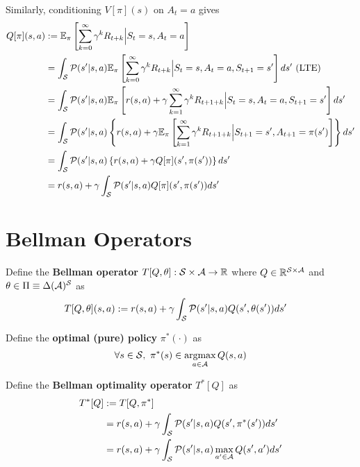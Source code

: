\documentclass{article}
\begin{document}
	Similarly, conditioning $V[\pi](s)$ on $A_t = a$ gives 
	\begin{align}
		Q[\pi](s, a) &:= \mathbb{E}_{\pi}\left[\sum_{k=0}^{\infty} \gamma^{k} R_{t+k} \Big| S_{t}=s, A_t = a\right] \\
		&= \int_{\mathcal{{S}}}
			\mathcal{{P}}(s'|s, a)
			\mathbb{E}_\pi
			\left[ \sum_{k=0}^{\infty} \gamma^{k} R_{t+k} \Big| S_{t}=s, A_t = a, S_{t+1} = s' \right]
			ds' \text{{ (LTE)}} \\
		&= \int_{\mathcal{{S}}}
			\mathcal{{P}}(s'|s, a)
			\mathbb{E}_\pi
			\left[ r(s,a) + \gamma \sum_{k=1}^{\infty} \gamma^{k} R_{t+1+k} \Big| S_{t}=s, A_t = a, S_{t+1} = s' \right] ds' \\
		&= \int_{\mathcal{{S}}}
			\mathcal{{P}}(s'|s, a) \left\{
			r(s,a) + \gamma \mathbb{E}_\pi
			\left[\sum_{k=1}^{\infty} \gamma^{k} R_{t+1+k} \Big| S_{t+1} = s', A_{t+1} = \pi(s')\right] \right \}ds' \\
		&= \int_{\mathcal{{S}}}
			\mathcal{{P}}(s'|s, a) \left\{
			r(s,a) + \gamma Q[\pi](s', \pi(s')) \right \}ds' \\
		&= r(s,a) + \gamma \int_{\mathcal{{S}}}
			\mathcal{{P}}(s'|s, a) Q[\pi](s', \pi(s')) ds'
	\end{align}
	
	\section{Bellman Operators}
	\begin{definition}
		Define the \textbf{Bellman operator} $T[Q, \theta]: \mathcal{{S}} \times \mathcal{{A}} \to \mathbb{R}$ where $Q \in \mathbb{R}^{\mathcal{{S}} \times \mathcal{{A}}}$ and $\theta \in \Pi \equiv \Delta(\mathcal{{A}})^{\mathcal{{S}}}$ as 
		\begin{align}
			T[Q, \theta] (s, a) &:= r(s, a) + \gamma \int_{\mathcal{{S}}} 
			\mathcal{{P}}(s'|s, a) Q(s', \theta(s')) ds'
		\end{align}
	\end{definition}
	
	\begin{definition}
		Define the \textbf{optimal (pure) policy} $\pi^*(\cdot)$ as 
		\begin{align}
			\forall s \in \mathcal{{S}},\ \pi^*(s) \in \operatorname*{argmax}_{a \in \mathcal{{A}}} Q(s, a)
		\end{align}
	\end{definition}
	
	\begin{definition}
		Define the \textbf{Bellman optimality operator} $T^*[Q]$ as 
		\begin{align}
			T^*[Q] &:= T[Q, \pi^*] \\
			&= r(s, a) + \gamma \int_{\mathcal{{S}}} 
			\mathcal{{P}}(s'|s, a) Q(s', \pi^*(s')) ds' \\
			&= r(s, a) + \gamma \int_{\mathcal{{S}}} 
			\mathcal{{P}}(s'|s, a) \max_{a' \in \mathcal{{A}}} Q(s', a') ds'
		\end{align}
	\end{definition}
	
\end{document}
